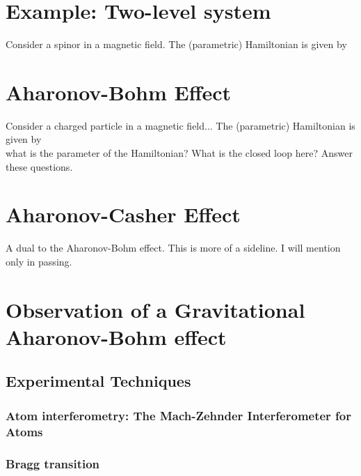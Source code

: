 \documentclass{article}
\theoremstyle{definition}
\begin{document}
\section{Example: Two-level system}

Consider a spinor in a magnetic field. The (parametric) Hamiltonian is given by 



\section{Aharonov-Bohm Effect}

Consider a charged particle in a magnetic field... The (parametric) Hamiltonian is given by \\ 



what is the parameter of the Hamiltonian? What is the closed loop here? Answer these questions. 


\section{Aharonov-Casher Effect}

A dual to the Aharonov-Bohm effect. This is more of a sideline. I will mention only in passing.

\section{Observation of a Gravitational Aharonov-Bohm effect}




\subsection{Experimental Techniques}


\subsubsection{Atom interferometry: The Mach-Zehnder Interferometer for Atoms}

\subsubsection{Bragg transition}
\end{document}
